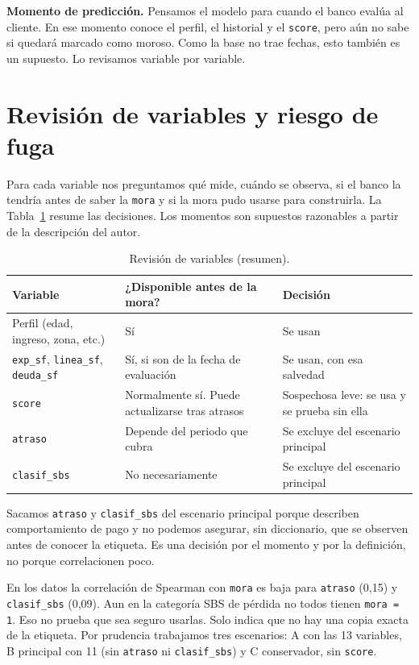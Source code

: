 \documentclass[11pt]{article}
\begin{document}
\textbf{Momento de predicción.} Pensamos el modelo para cuando el banco evalúa al cliente. En ese momento conoce el perfil, el historial y el \texttt{score}, pero aún no sabe si quedará marcado como moroso. Como la base no trae fechas, esto también es un supuesto. Lo revisamos variable por variable.

\section{Revisión de variables y riesgo de fuga}

Para cada variable nos preguntamos qué mide, cuándo se observa, si el banco la tendría antes de saber la \texttt{mora} y si la mora pudo usarse para construirla. La Tabla~\ref{tab:variables} resume las decisiones. Los momentos son supuestos razonables a partir de la descripción del autor.

\begin{table}[H]
\centering
\caption{Revisión de variables (resumen).}
\label{tab:variables}
\small
\begin{tabular}{@{}lll@{}}
\toprule
\textbf{Variable} & \textbf{¿Disponible antes de la mora?} & \textbf{Decisión} \\
\midrule
Perfil (edad, ingreso, zona, etc.) & Sí & Se usan \\
\texttt{exp\_sf}, \texttt{linea\_sf}, \texttt{deuda\_sf} & Sí, si son de la fecha de evaluación & Se usan, con esa salvedad \\
\texttt{score} & Normalmente sí. Puede actualizarse tras atrasos & Sospechosa leve: se usa y se prueba sin ella \\
\texttt{atraso} & Depende del periodo que cubra & Se excluye del escenario principal \\
\texttt{clasif\_sbs} & No necesariamente & Se excluye del escenario principal \\
\bottomrule
\end{tabular}
\end{table}

Sacamos \texttt{atraso} y \texttt{clasif\_sbs} del escenario principal porque describen comportamiento de pago y no podemos asegurar, sin diccionario, que se observen antes de conocer la etiqueta. Es una decisión por el momento y por la definición, no porque correlacionen poco.

En los datos la correlación de Spearman con \texttt{mora} es baja para \texttt{atraso} (0,15) y \texttt{clasif\_sbs} (0,09). Aun en la categoría SBS de pérdida no todos tienen \texttt{mora = 1}. Eso no prueba que sea seguro usarlas. Solo indica que no hay una copia exacta de la etiqueta. Por prudencia trabajamos tres escenarios: A con las 13 variables, B principal con 11 (sin \texttt{atraso} ni \texttt{clasif\_sbs}) y C conservador, sin \texttt{score}.
\end{document}
